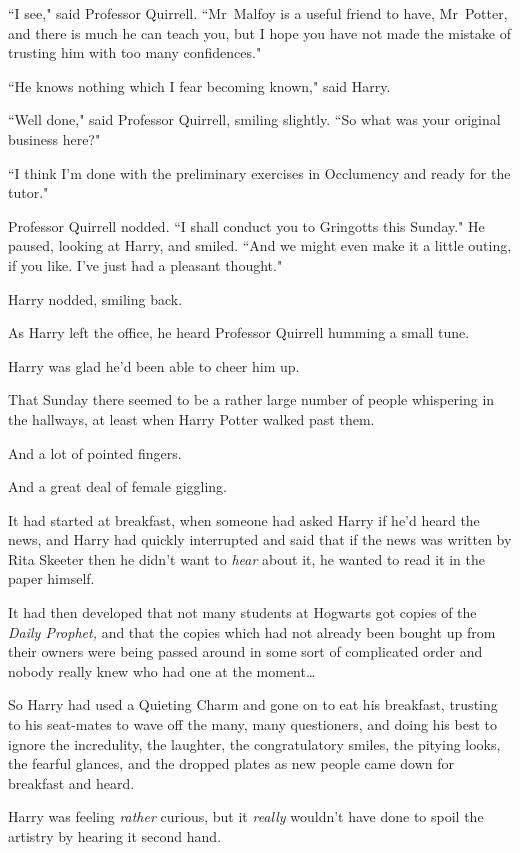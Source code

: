 ``I see," said Professor Quirrell. ``Mr~Malfoy is a useful friend to have, Mr~Potter, and there is much he can teach you, but I hope you have not made the mistake of trusting him with too many confidences."

``He knows nothing which I fear becoming known," said Harry.

``Well done," said Professor Quirrell, smiling slightly. ``So what was your original business here?"

``I think I'm done with the preliminary exercises in Occlumency and ready for the tutor."

Professor Quirrell nodded. ``I shall conduct you to Gringotts this Sunday." He paused, looking at Harry, and smiled. ``And we might even make it a little outing, if you like. I've just had a pleasant thought."

Harry nodded, smiling back.

As Harry left the office, he heard Professor Quirrell humming a small tune.

Harry was glad he'd been able to cheer him up.

\later

That Sunday there seemed to be a rather large number of people whispering in the hallways, at least when Harry Potter walked past them.

And a lot of pointed fingers.

And a great deal of female giggling.

It had started at breakfast, when someone had asked Harry if he'd heard the news, and Harry had quickly interrupted and said that if the news was written by Rita Skeeter then he didn't want to \emph{hear} about it, he wanted to read it in the paper himself.

It had then developed that not many students at Hogwarts got copies of the \emph{Daily Prophet,} and that the copies which had not already been bought up from their owners were being passed around in some sort of complicated order and nobody really knew who had one at the moment{\ldots}

So Harry had used a Quieting Charm and gone on to eat his breakfast, trusting to his seat-mates to wave off the many, many questioners, and doing his best to ignore the incredulity, the laughter, the congratulatory smiles, the pitying looks, the fearful glances, and the dropped plates as new people came down for breakfast and heard.

Harry was feeling \emph{rather} curious, but it \emph{really} wouldn't have done to spoil the artistry by hearing it second hand.

